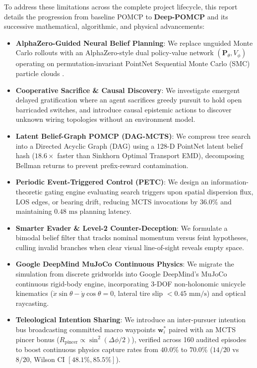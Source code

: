 \documentclass[conference]{IEEEtran}
\begin{document}
To address these limitations across the complete project lifecycle, this report details the progression from baseline POMCP to \textbf{Deep-POMCP} and its successive mathematical, algorithmic, and physical advancements:
\begin{itemize}
    \item \textbf{AlphaZero-Guided Neural Belief Planning}: We replace unguided Monte Carlo rollouts with an AlphaZero-style dual policy-value network $(\mathbf{P}_\theta, V_\phi)$ operating on permutation-invariant PointNet Sequential Monte Carlo (SMC) particle clouds \cite{qi2017pointnet, silver2017mastering}.
    \item \textbf{Cooperative Sacrifice \& Causal Discovery}: We investigate emergent delayed gratification where an agent sacrifices greedy pursuit to hold open barricaded switches, and introduce causal epistemic actions to discover unknown wiring topologies without an environment model.
    \item \textbf{Latent Belief-Graph POMCP (DAG-MCTS)}: We compress tree search into a Directed Acyclic Graph (DAG) using a 128-D PointNet latent belief hash ($18.6\times$ faster than Sinkhorn Optimal Transport EMD), decomposing Bellman returns to prevent prefix-reward contamination.
    \item \textbf{Periodic Event-Triggered Control (PETC)}: We design an information-theoretic gating engine evaluating search triggers upon spatial dispersion flux, LOS edges, or bearing drift, reducing MCTS invocations by $36.0\%$ and maintaining $0.48\text{ ms}$ planning latency.
    \item \textbf{Smarter Evader \& Level-2 Counter-Deception}: We formulate a bimodal belief filter that tracks nominal momentum versus feint hypotheses, culling invalid branches when clear visual line-of-sight reveals empty space.
    \item \textbf{Google DeepMind MuJoCo Continuous Physics}: We migrate the simulation from discrete gridworlds into Google DeepMind's MuJoCo continuous rigid-body engine, incorporating 3-DOF non-holonomic unicycle kinematics ($\dot{x}\sin\theta - \dot{y}\cos\theta = 0$, lateral tire slip $< 0.45\text{ mm/s}$) and optical raycasting.
    \item \textbf{Teleological Intention Sharing}: We introduce an inter-pursuer intention bus broadcasting committed macro waypoints $\mathbf{w}_i^*$ paired with an MCTS pincer bonus ($R_{\text{pincer}} \propto \sin^2(\Delta\phi/2)$), verified across 160 audited episodes to boost continuous physics capture rates from $40.0\%$ to $\mathbf{70.0\%}$ ($14/20$ vs $8/20$, Wilson CI $[48.1\%, 85.5\%]$).
\end{itemize}
\end{document}

